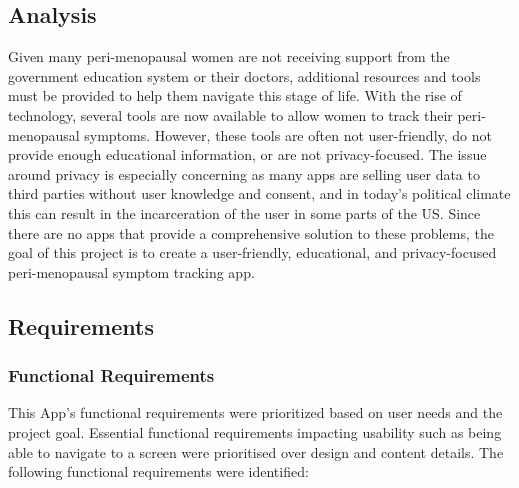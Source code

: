 \subsection{Analysis}
Given many peri-menopausal women are not receiving support from the government education system or their doctors\cite{Aljumah2023}\cite{MenopauseSupport2021}\cite{UCL2023}, additional resources and tools must be provided to help them navigate this stage of life. With the rise of technology, several tools are now available to allow women to track their peri-menopausal symptoms. However, these tools are often not user-friendly, do not provide enough educational information, or are not privacy-focused. The issue around privacy is especially concerning as many apps are selling user data to third parties without user knowledge and consent, and in today's political climate this can result in the incarceration of the user in some parts of the US\cite{Kelly2023}. Since there are no apps that provide a comprehensive solution to these problems, the goal of this project is to create a user-friendly, educational, and privacy-focused peri-menopausal symptom tracking app.

\subsection{Requirements}

\subsubsection{Functional Requirements}
This App's functional requirements were prioritized based on user needs and the project goal. Essential functional requirements impacting usability such as being able to navigate to a screen were prioritised over design and content details. The following functional requirements were identified:

